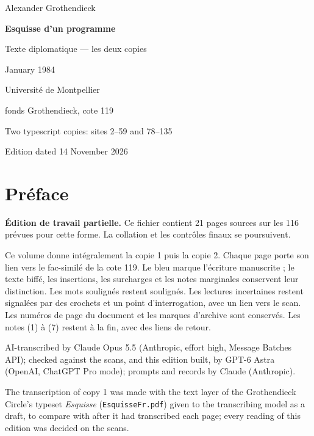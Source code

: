 \documentclass[11pt,a4paper]{article}
\newcommand{\EditionTitle}{Esquisse d'un programme}
\newcommand{\EditionForm}{Texte diplomatique — les deux copies}
\begin{document}
\begin{titlepage}
\centering
\vspace*{18mm}
{\Large Alexander Grothendieck\par}
\vspace{12mm}
{\Huge\bfseries\EditionTitle\par}
\vspace{8mm}
{\Large\EditionForm\par}
\vspace{14mm}
{\large January 1984\par}
\vfill
{\large Université de Montpellier\par fonds Grothendieck, cote 119\par}
\vspace{8mm}
{\normalsize Two typescript copies: sites 2--59 and 78--135\par}
\vspace{8mm}
{\normalsize Edition dated 14 November 2026\par}
\end{titlepage}
\thispagestyle{plain}
\section*{Préface}
\noindent\textbf{Édition de travail partielle.} Ce fichier contient 21 pages sources sur les 116 prévues pour cette forme. La collation et les contrôles finaux se poursuivent.\par\smallskip
Ce volume donne intégralement la copie 1 puis la copie 2. Chaque page porte son lien vers le fac-similé de la cote 119. Le bleu marque l’écriture manuscrite ; le texte biffé, les insertions, les surcharges et les notes marginales conservent leur distinction. Les mots soulignés restent soulignés. Les lectures incertaines restent signalées par des crochets et un point d’interrogation, avec un lien vers le scan. Les numéros de page du document et les marques d’archive sont conservés. Les notes (1) à (7) restent à la fin, avec des liens de retour.

\smallskip
AI-transcribed by Claude Opus 5.5 (Anthropic, effort high, Message Batches API); checked against the scans, and this edition built, by GPT-6 Astra (OpenAI, ChatGPT Pro mode); prompts and records by Claude (Anthropic).


The transcription of copy 1 was made with the text layer of the Grothendieck Circle's typeset \textit{Esquisse} (\texttt{EsquisseFr.pdf}) given to the transcribing model as a draft, to compare with after it had transcribed each page; every reading of this edition was decided on the scans.
\end{document}
